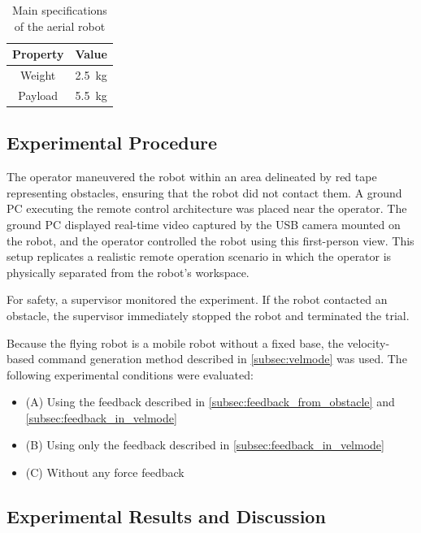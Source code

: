 \documentclass{WileyMSP-template}
\begin{document}
\begin{table}[H]
  \centering
  \caption{Main specifications of the aerial robot}
  \begin{tabular}{cc} \hline
    Property & Value \\ \hline
    Weight & \SI{2.5}{kg} \\
    Payload & \SI{5.5}{kg} \\ \hline
  \end{tabular}
  \label{tab:beatle_properties}
\end{table}

\subsection{Experimental Procedure}

The operator maneuvered the robot within an area delineated by red tape representing obstacles, ensuring that the robot did not contact them.  
A ground PC executing the remote control architecture was placed near the operator.  
The ground PC displayed real-time video captured by the USB camera mounted on the robot, and the operator controlled the robot using this first-person view.  
This setup replicates a realistic remote operation scenario in which the operator is physically separated from the robot’s workspace.

For safety, a supervisor monitored the experiment.  
If the robot contacted an obstacle, the supervisor immediately stopped the robot and terminated the trial.

Because the flying robot is a mobile robot without a fixed base, the velocity-based command generation method described in \ref{subsec:velmode} was used.  
The following experimental conditions were evaluated:

\begin{itemize}
  \item (A) Using the feedback described in \ref{subsec:feedback_from_obstacle} and \ref{subsec:feedback_in_velmode}
  \item (B) Using only the feedback described in \ref{subsec:feedback_in_velmode}
  \item (C) Without any force feedback
\end{itemize}

\subsection{Experimental Results and Discussion}
\end{document}
